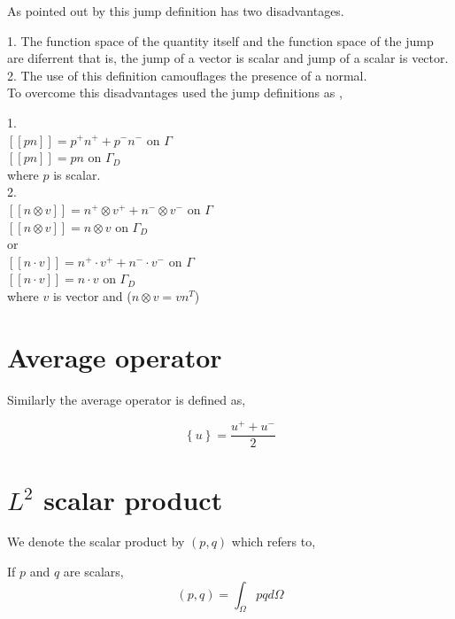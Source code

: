 \documentclass[a4paper,12pt]{book}
\begin{document}
As pointed out by \cite{Montlaur2} this jump definition has two disadvantages.

1. The function space of the quantity itself and the function space of the jump are diferrent that is, the jump of a vector is scalar and jump of a scalar is vector.\\
2. The use of this definition camouflages the presence of a normal.\\

To overcome this disadvantages \cite{Montlaur2} used the jump definitions as ,

1. \\
$[[pn]] = p^+ n^+ + p^- n^- $ on $\Gamma$\\
$[[pn]] = p n $ on $\Gamma_D$\\
where $p$ is scalar. \\

2. \\
$[[n \otimes v]] = n^+ \otimes v^+ + n^- \otimes v^-$ on $\Gamma$\\
$[[n \otimes v]] = n \otimes v$ on $\Gamma_D$\\
 or \\
$[[n \cdot v]] = n^+ \cdot v^+ + n^- \cdot v^-$ on $\Gamma$\\
$[[n \cdot v]] = n \cdot v$ on $\Gamma_D$\\
where $v$ is vector and ($n \otimes v = v n^T$)\\

\section{Average operator}

Similarly the average operator is defined as,

\begin{equation}\label{average operator}
\left\lbrace u \right\rbrace = \frac{u^+ + u^-}{2}  
\end{equation} 

\section{$L^2$ scalar product}

We denote the scalar product by $(p,q)$ which refers to,

If $p$ and $q$ are scalars,
\begin{equation}\label{inner product scalars}
(p,q)=\int_{\Omega} pq d \Omega 
\end{equation}
\end{document}

